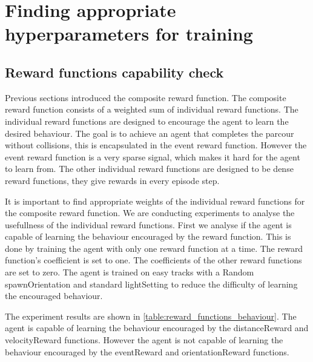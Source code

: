 \chapter{Finding appropriate hyperparameters for training}


\section{Reward functions capability check}

Previous sections introduced the composite reward function. The composite reward function consists of a weighted sum of individual reward functions. The individual reward functions are designed to encourage the agent to learn the desired behaviour. The goal is to achieve an agent that completes the parcour without collisions, this is encapsulated in the event reward function. However the event reward function is a very sparse signal, which makes it hard for the agent to learn from. The other individual reward functions are designed to be dense reward functions, they give rewards in every episode step.

It is important to find appropriate weights of the individual reward functions for the composite reward function. We are conducting experiments to analyse the usefullness of the individual reward functions. First we analyse if the agent is capable of learning the behaviour encouraged by the reward function.
This is done by training the agent with only one reward function at a time. The reward function's coefficient is set to one. The coefficients of the other reward functions are set to zero. The agent is trained on easy tracks with a Random spawnOrientation and standard lightSetting to reduce the difficulty of learning the encouraged behaviour.


The experiment results are shown in \ref{table:reward_functions_behaviour}. The agent is capable of learning the behaviour encouraged by the distanceReward and velocityReward functions. However the agent is not capable of learning the behaviour encouraged by the eventReward and orientationReward functions. 


